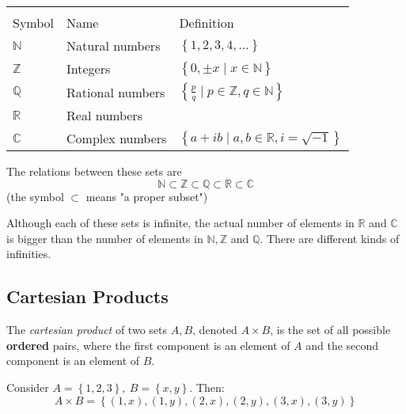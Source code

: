 \centering
\begingroup\setlength{\fboxsep}{0pt}
\colorbox{col2!10}{%
\begin{tabular}{lll}
  \rowcolor{col2!75}\multicolumn{3}{l}{\color{white}\textbf{Important Number Sets}}\\
  \rule{0pt}{4ex}
  Symbol & Name & Definition \\
  \midrule
  $\mathbb{N}$ & Natural numbers & $\left\{1,2,3,4,\dots\right\}$\\
  $\mathbb{Z}$ & Integers & $\left\{ 0,\pm x \mid x\in\mathbb{N} \right\}$\\
  $\mathbb{Q}$ & Rational numbers & $\left\{ \frac{p}{q} \mid p\in\mathbb{Z}, q\in\mathbb{N} \right\}$\\
  $\mathbb{R}$ & Real numbers & \\
  $\mathbb{C}$ & Complex numbers & $\left\{ a+ib \mid a,b\in\mathbb{R}, i=\sqrt{-1} \right\}$\\
  \midrule
\end{tabular}
}\flushleft

The relations between these sets are
\begin{equation*}
  \mathbb{N}\subset \mathbb{Z}\subset\mathbb{Q}\subset\mathbb{R}\subset\mathbb{C}
\end{equation*}
(the symbol $\subset$ means "a proper subset")

\begin{warning}
  Although each of these sets is infinite, the actual number of elements in $\mathbb{R}$ and $\mathbb{C}$ is bigger than the number of elements in $\mathbb{N},\mathbb{Z}$ and $\mathbb{Q}$. There are different kinds of infinities.
\end{warning}

\subsection{Cartesian Products}
The \emph{cartesian product} of two sets $A,B$, denoted $A\times B$, is the set of all possible \textbf{ordered} pairs, where the first component is an element of $A$ and the second component is an element of $B$.
\begin{example}
  Consider $A=\left\{ 1,2,3 \right\},\ B=\left\{ x, y \right\}$. Then:
  \begin{equation*}
  A\times B = \left\{ \left( 1,x \right), \left( 1,y \right), \left( 2,x \right), \left( 2,y \right), \left( 3,x \right), \left( 3,y \right) \right\}
  \end{equation*}
\end{example}

